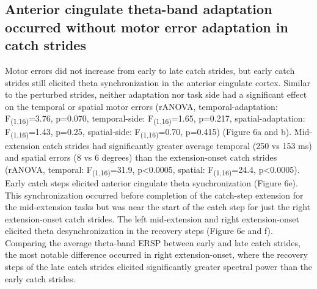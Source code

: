 \documentclass[shortpaper,twoside,web]{ieeecolor}
\newcommand{\tsu}[1]{\textsubscript{#1}}
\begin{document}
\subsection{Anterior cingulate theta-band adaptation occurred without motor error adaptation in catch strides}
Motor errors did not increase from early to late catch strides, but early catch strides still elicited theta synchronization in the anterior cingulate cortex. Similar to the perturbed strides, neither adaptation nor task side had a significant effect on the temporal or spatial motor errors (rANOVA, temporal-adaptation: F\tsu{(1,16)}=3.76, p=0.070, temporal-side: F\tsu{(1,16)}=1.65, p=0.217, spatial-adaptation: F\tsu{(1,16)}=1.43, p=0.25, spatial-side: F\tsu{(1,16)}=0.70, p=0.415) (Figure 6a and b). Mid-extension catch strides had significantly greater average temporal (250 vs 153 ms) and spatial errors (8 vs 6 degrees) than the extension-onset catch strides (rANOVA, temporal: F\tsu{(1,16)}=31.9, p<0.0005, spatial: F\tsu{(1,16)}=24.4, p<0.0005). Early catch steps elicited anterior cingulate theta synchronization (Figure 6e). This synchronization occurred before completion of the catch-step extension for the mid-extension tasks but was near the start of the catch step for just the right extension-onset catch strides. The left mid-extension and right extension-onset elicited theta desynchronization in the recovery steps (Figure 6e and f). Comparing the average theta-band ERSP between early and late catch strides, the most notable difference occurred in right extension-onset, where the recovery steps of the late catch strides elicited significantly greater spectral power than the early catch strides.
\end{document}
